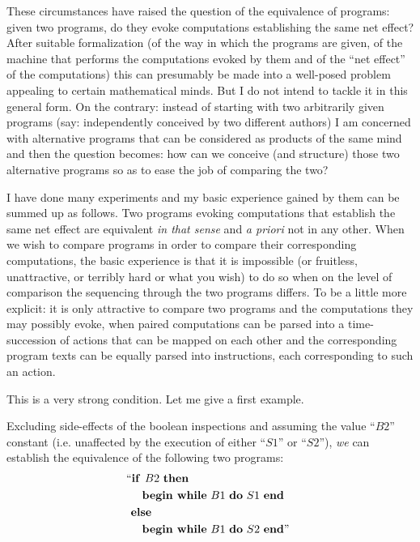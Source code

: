 These circumstances have raised the question of the equivalence of programs: given two programs, do they evoke computations establishing the same net effect? After suitable formalization (of the way in which the programs are given, of the machine that performs the computations evoked by them and of the ``net effect'' of the computations) this can presumably be made into a well-posed problem appealing to certain mathematical minds. But I do not intend to tackle it in this general form. On the contrary: instead of starting with two arbitrarily given programs (say: independently conceived by two different authors) I am concerned with alternative programs that can be considered as products of the same mind and then the question becomes: how can we conceive (and structure) those two alternative programs so as to ease the job of comparing the two?

I have done many experiments and my basic experience gained by them can be summed up as follows. Two programs evoking computations that establish the same net effect are equivalent \textit{in that sense} and \textit{a priori} not in any other. When we wish to compare programs in order to compare their corresponding computations, the basic experience is that it is impossible (or fruitless, unattractive, or terribly hard or what you wish) to do so when on the level of comparison the sequencing through the two programs differs. To be a little more explicit: it is only attractive to compare two programs and the computations they may possibly evoke, when paired computations can be parsed into a time-succession of actions that can be mapped on each other and the corresponding program texts can be equally parsed into instructions, each corresponding to such an action.

This is a very strong condition. Let me give a first example.

Excluding side-effects of the boolean inspections and assuming the value ``$B2$'' constant (i.e. unaffected by the execution of either ``$S1$'' or ``$S2$''), \textit{we} can establish the equivalence of the following two programs:
\begin{equation}
	\label{eq:comparing-example-1}
	\begin{split}
	&\text{\hspace{-.4em}``\textbf{if }} B2\text{ \textbf{then}}\\
	&\quad \text{\textbf{begin while} } B1\text{ \textbf{do} } S1 \text{ \textbf{end}}\\
	&\text{\textbf{else}}\\
	&\quad \text{\textbf{begin while} } B1\text{ \textbf{do} } S2\text{ \textbf{end}''}
	\end{split}
\end{equation}


